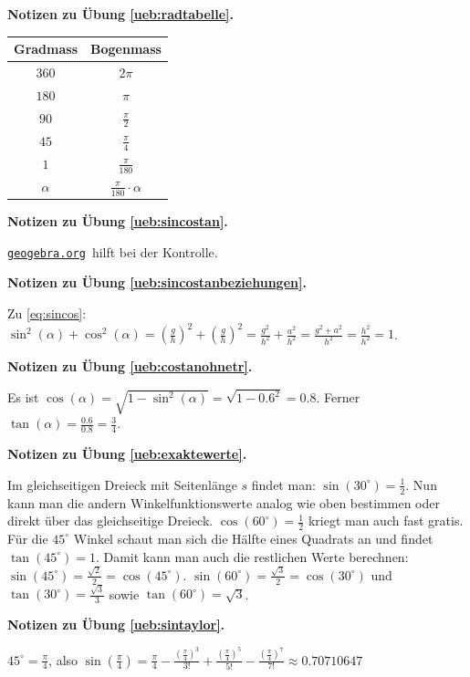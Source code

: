 \documentclass[%
11pt,%
twoside,%
titlepage,%
german,%
headsepline%
]{scrartcl}
\newcommand{\geogebralink}{\href{https://www.geogebra.org/calculator}{\texttt{geogebra.org}}}
\newcommand{\spaltenheight}{\rule{0mm}{3ex}}
\newcommand{\spaltensep}{\\[1ex]}
\newcommand{\concatueb}[1]{ueb:#1}%
\newcommand{\concatlsg}[1]{lsg:#1}%
\newenvironment{lsg}[1]{%
    \par\noindent\textbf{Notizen zu Übung \ref{\concatueb{#1}}.}%
    \label{\concatlsg{#1}}
}{%
    \par%
}
\begin{document}
\begin{lsg}{radtabelle}
\begin{center}
\small
\begin{tabular}{|c|c|}
\hline
\rowcolor{Gray}\spaltenheight \textbf{Gradmass} & \textbf{Bogenmass}\spaltensep\hline
\rowcolor{lightyellow}\spaltenheight $360$ & $2\pi$\spaltensep\hline
\rowcolor{Gray}\spaltenheight $180$ & $\pi$\spaltensep\hline
\rowcolor{lightyellow}\spaltenheight $90$ & $\frac{\pi}{2}$\spaltensep\hline
\rowcolor{Gray}\spaltenheight $45$ & $\frac{\pi}{4}$\spaltensep\hline
\rowcolor{lightyellow}\spaltenheight $1$ & $\frac{\pi}{180}$\spaltensep\hline
\rowcolor{Gray}\spaltenheight $\alpha$ & $\frac{\pi}{180}\cdot\alpha$\spaltensep\hline
\end{tabular}
\end{center}
\end{lsg}
\begin{lsg}{sincostan}
\geogebralink\ hilft bei der Kontrolle.
\end{lsg}
\begin{lsg}{sincostanbeziehungen}
Zu \eqref{eq:sincos}: $\sin^{2}(\alpha)+\cos^{2}(\alpha)=\left(\frac{g}{h}\right)^{2}+\left(\frac{g}{h}\right)^{2}=\frac{g^{2}}{h^{2}}+\frac{a^{2}}{h^{2}}=\frac{g^{2}+a^{2}}{h^{2}}=\frac{h^{2}}{h^{2}}=1$.
\end{lsg}
\begin{lsg}{costanohnetr}
Es ist $\cos(\alpha)=\sqrt{1-\sin^{2}(\alpha)}=\sqrt{1-0.6^{2}}=0.8$. Ferner $\tan(\alpha)=\frac{0.6}{0.8}=\frac{3}{4}$.
\end{lsg}
\begin{lsg}{exaktewerte}
Im gleichseitigen Dreieck mit Seitenl\"ange $s$ findet man: $\sin(30^{\circ})=\frac{1}{2}$. Nun kann man die andern Winkelfunktionswerte analog wie oben bestimmen oder direkt \"uber das gleichseitige Dreieck. $\cos(60^{\circ})=\frac{1}{2}$ kriegt man auch fast gratis. F\"ur die $45^{\circ}$ Winkel schaut man sich die H\"alfte eines Quadrats an und findet $\tan(45^{\circ})=1$. Damit kann man auch die restlichen Werte berechnen: $\sin(45^{\circ})=\frac{\sqrt{2}}{2}=\cos(45^{\circ})$. $\sin(60^{\circ})=\frac{\sqrt{3}}{2}=\cos(30^{\circ})$ und $\tan(30^{\circ})=\frac{\sqrt{3}}{3}$ sowie $\tan(60^{\circ})=\sqrt{3}$.
\end{lsg}
\begin{lsg}{sintaylor}
$45^{\circ}=\frac{\pi}{4}$, also $\sin(\frac{\pi}{4})=\frac{\pi}{4}-\frac{(\frac{\pi}{4})^{3}}{3!}+\frac{(\frac{\pi}{4})^{5}}{5!}-\frac{(\frac{\pi}{4})^{7}}{7!}\approx0.70710647$
\end{lsg}
\end{document}
